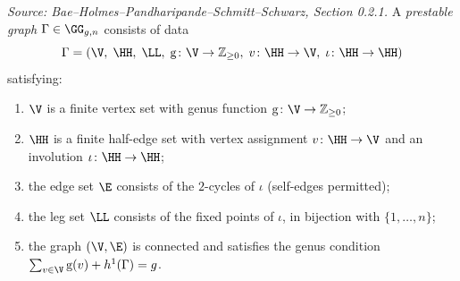 \begin{definition}
  \label{def:prestable_graph}
  \textit{Source: Bae--Holmes--Pandharipande--Schmitt--Schwarz, Section 0.2.1.}
  A \emph{prestable graph} $\Gamma \in \GG_{g,n}$ consists of data
  \[
    \Gamma = (\V,\; \HH,\; \LL,\; \mathrm{g}\colon \V \to \mathbb{Z}_{\geq 0},\;
              v\colon \HH \to \V,\; \iota\colon \HH \to \HH)
  \]
  satisfying:
  \begin{enumerate}
  \item[(i)] $\V$ is a finite vertex set with genus function $\mathrm{g}\colon \V \to \mathbb{Z}_{\geq 0}$;
  \item[(ii)] $\HH$ is a finite half-edge set with vertex assignment $v\colon \HH \to \V$
    and an involution $\iota\colon \HH \to \HH$;
  \item[(iii)] the edge set $\E$ consists of the $2$-cycles of $\iota$ (self-edges permitted);
  \item[(iv)] the leg set $\LL$ consists of the fixed points of $\iota$, in bijection with
    $\{1,\ldots,n\}$;
  \item[(v)] the graph $(\V,\E)$ is connected and satisfies the genus condition
    $\sum_{v \in \V} \mathrm{g}(v) + h^1(\Gamma) = g$.
  \end{enumerate}
\end{definition}

